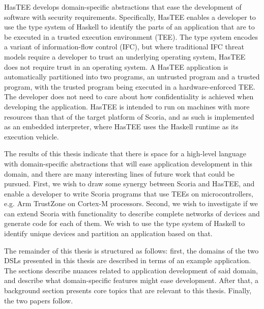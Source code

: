 HasTEE develops domain-specific abstractions that ease the development of software with security requirements. Specifically,
HasTEE enables a developer to use the type system of Haskell to identify the parts of an application that are to be executed in a
trusted execution environment (TEE). The type system encodes a variant of information-flow control (IFC), but where traditional
IFC threat models require a developer to trust an underlying operating system, HasTEE does not require trust in an operating system.
A HasTEE application is automatically partitioned into two programs, an untrusted program and a trusted program, with the trusted
program being executed in a hardware-enforced TEE. The developer does not need to care about how confidentiality
is achieved when developing the application. HasTEE is intended to run on machines with more resources than that of the target
platform of Scoria, and as such is implemented as an embedded interpreter, where HasTEE uses the Haskell runtime as its execution
vehicle.

The results of this thesis indicate that there is space for a high-level language with domain-specific abstractions
that will ease application development in this domain, and there are many interesting lines of future work that could be pursued.
First, we wish to draw some synergy between Scoria and HasTEE, and enable a developer to write Scoria programs that use TEEs on
microcontrollers, e.g. Arm TrustZone on Cortex-M processors. Second, we wish to investigate if we can extend Scoria with
functionality to describe complete networks of devices and generate code for each of them. We wish to use the type system of
Haskell to identify unique devices and partition an application based on that.

The remainder of this thesis is structured as follows: first, the domains of the two DSLs presented in this thesis are
described in terms of an example application. The sections describe nuances related to application development of said domain,
and describe what domain-specific features might ease development. After that, a background section presents core topics that
are relevant to this thesis. Finally, the two papers follow.

